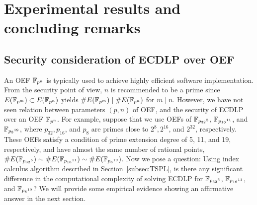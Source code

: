 %
%

\section{Experimental results and concluding remarks}\label{sec:experimental-results}
%
\subsection{Security consideration of ECDLP over OEF}
%
An OEF ${\mathbb F}_{p^n}$ is typically used to achieve highly efficient software
implementation.
%
From the security point of view, $n$ is recommended to be a prime
since $E({\mathbb F}_{p^m}) \subset E({\mathbb F}_{p^n})$ yields $\#E({\mathbb F}_{p^m}) \mid \# E({\mathbb F}_{p^n})$ for
$m \mid n$.
%
However, we have not seen relation between parameters $(p, n)$ of OEF,
and the security of ECDLP over an OEF ${\mathbb F}_{p^n}$.
%
For example, suppose that we use OEFs of $\mathbb F_{{p_{32}}^5}$,
$\mathbb F_{{p_{16}}^{11}}$, and $\mathbb F_{{p_{8}}^{19}}$, where $p_{32}, p_{16}$,
and $p_{8}$ are primes close to $2^8, 2^{16}$, and $2^{32}$,
respectively.
%
These OEFs satisfy a condition of prime extension degree of 5, 11, and
19, respectively, and have almost the same number of rational points,
$\#E(\mathbb F_{{p_{32}}^5}) \sim \#E(\mathbb F_{{p_{16}}^{11}}) \sim
\#E(\mathbb F_{{p_{8}}^{19}})$.
%
Now we pose a question: Using index calculus algorithm described in
Section~\ref{subsec:TSPL}, is there any significant difference in the
computational complexity of solving ECDLP for $\mathbb F_{{p_{32}}^5}$,
$\mathbb F_{{p_{16}}^{11}}$, and $\mathbb F_{{p_{8}}^{19}}$?
%
We will provide some empirical evidence showing an affirmative answer
in the next section.

